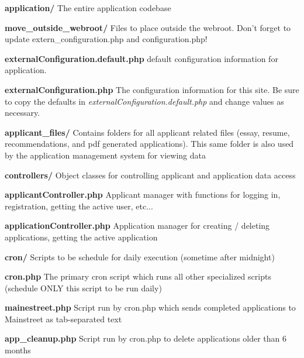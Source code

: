 \begin{DoxyItemize}
\item {\bfseries application/} The entire application codebase


\begin{DoxyItemize}
\item {\bfseries move\-\_\-outside\-\_\-webroot/} Files to place outside the webroot. Don't forget to update extern\-\_\-configuration.\-php and configuration.\-php!


\begin{DoxyItemize}
\item {\bfseries external\-Configuration.\-default.\-php} default configuration information for application.
\item {\bfseries external\-Configuration.\-php} The configuration information for this site. Be sure to copy the defaults in {\itshape external\-Configuration.\-default.\-php} and change values as necessary.
\item {\bfseries applicant\-\_\-files/} Contains folders for all applicant related files (essay, resume, recommendations, and pdf generated applications). This same folder is also used by the application management system for viewing data
\end{DoxyItemize}
\end{DoxyItemize}


\begin{DoxyItemize}
\item {\bfseries controllers/} Object classes for controlling applicant and application data access


\begin{DoxyItemize}
\item {\bfseries applicant\-Controller.\-php} Applicant manager with functions for logging in, registration, getting the active user, etc...
\item {\bfseries application\-Controller.\-php} Application manager for creating / deleting applications, getting the active application
\end{DoxyItemize}
\end{DoxyItemize}


\begin{DoxyItemize}
\item {\bfseries cron/} Scripts to be schedule for daily execution (sometime after midnight)


\begin{DoxyItemize}
\item {\bfseries cron.\-php} The primary cron script which runs all other specialized scripts (schedule O\-N\-L\-Y this script to be run daily)
\item {\bfseries mainestreet.\-php} Script run by cron.\-php which sends completed applications to Mainstreet as tab-\/separated text
\item {\bfseries app\-\_\-cleanup.\-php} Script run by cron.\-php to delete applications older than 6 months
\end{DoxyItemize}
\end{DoxyItemize}



\end{DoxyItemize}
